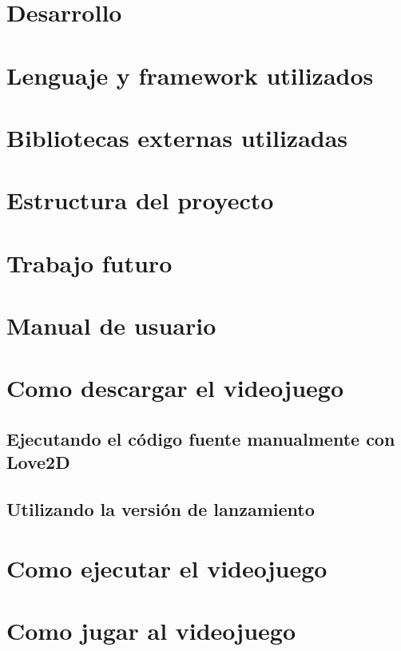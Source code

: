 \documentclass[12pt, spanish]{article}
\begin{document}
\section*{Desarrollo}
\label{sec:desarrollo}

\section{Lenguaje y framework utilizados}

\section{Bibliotecas externas utilizadas}

\section{Estructura del proyecto}


\section*{Trabajo futuro}
\label{sec:futuro}


\section*{Manual de usuario}
\label{sec:manual}

\section{Como descargar el videojuego}

\subsection{Ejecutando el código fuente manualmente con Love2D}

\subsection{Utilizando la versión de lanzamiento}


\section{Como ejecutar el videojuego}

\section{Como jugar al videojuego}
\end{document}

